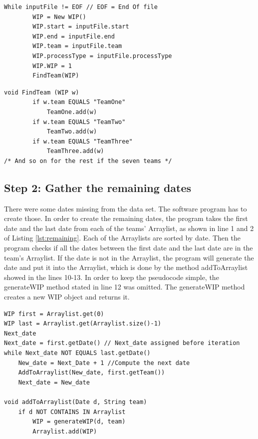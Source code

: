 \documentclass[UKenglish]{ifimaster}  %
\begin{document}
\begin{minipage}{\textwidth} 
 \begin{lstlisting}[caption={Gather all unique dates into Arraylist},label={lst:Arraylist}]
While inputFile != EOF // EOF = End Of file
		WIP = New WIP()
		WIP.start = inputFile.start
		WIP.end = inputFile.end
		WIP.team = inputFile.team
		WIP.processType = inputFile.processType
		WIP.WIP = 1
		FindTeam(WIP)
 \end{lstlisting}
 \end{minipage}

 
 \begin{lstlisting}[caption={Gather WIP object to the right data structure},label={lst:addWIP}]
void FindTeam (WIP w) 
		if w.team EQUALS "TeamOne"
			TeamOne.add(w)
		if w.team EQUALS "TeamTwo"
			TeamTwo.add(w)
		if w.team EQUALS "TeamThree"
			TeamThree.add(w)			
/* And so on for the rest if the seven teams */
 \end{lstlisting}
 
 
\subsection{Step 2: Gather the remaining dates}
 \label{sub:stepTwo}
There were some dates missing from the data set. The software program has to create those. In order to create the remaining dates, the program takes the first date and the last date from each of the teams' Arraylist, as shown in line 1 and 2 of Listing \ref{lst:remaining}. Each of the Arraylists are sorted by date. Then the program checks if all the dates between the first date and the last date are in the team's Arraylist. If the date is not in the Arraylist, the program will generate the date and put it into the Arraylist, which is done by the method addToArraylist showed in the lines 10-13. 
In order to keep the pseudocode simple, the generateWIP method stated in line 12 was omitted. The generateWIP method creates a new WIP object and returns it.

\begin{lstlisting}[caption={Gather the remaining dates.},label={lst:remaining}]
WIP first = Arraylist.get(0)
WIP last = Arraylist.get(Arraylist.size()-1)
Next_date 
Next_date = first.getDate() // Next_date assigned before iteration
while Next_date NOT EQUALS last.getDate()
	New_date = Next_Date + 1 //Compute the next date
	AddToArraylist(New_date, first.getTeam())
	Next_date = New_date

void addToArraylist(Date d, String team)
	if d NOT CONTAINS IN Arraylist
		WIP = generateWIP(d, team)
		Arraylist.add(WIP) 
 \end{lstlisting}
\end{document}
